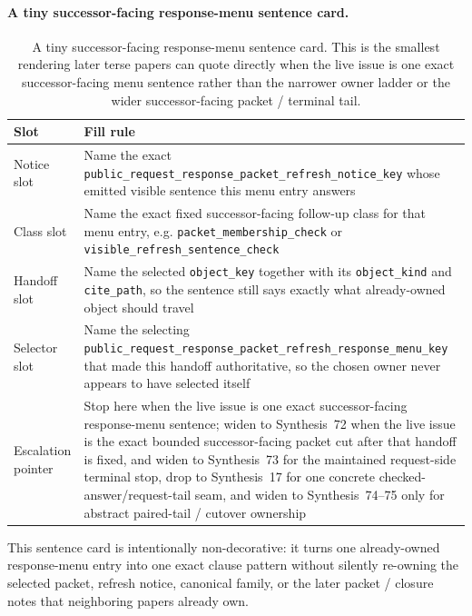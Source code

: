 \documentclass[11pt]{article}
\begin{document}
\paragraph{A tiny successor-facing response-menu sentence card.}
\begin{table}[t]
\centering
\small
\begin{tabularx}{\linewidth}{@{}lX@{}}
\toprule
Slot & Fill rule \\
\midrule
Notice slot & Name the exact \nolinkurl{public_request_response_packet_refresh_notice_key} whose emitted visible sentence this menu entry answers \\
Class slot & Name the exact fixed successor-facing follow-up class for that menu entry, e.g. \nolinkurl{packet_membership_check} or \nolinkurl{visible_refresh_sentence_check} \\
Handoff slot & Name the selected \nolinkurl{object_key} together with its \nolinkurl{object_kind} and \nolinkurl{cite_path}, so the sentence still says exactly what already-owned object should travel \\
Selector slot & Name the selecting \nolinkurl{public_request_response_packet_refresh_response_menu_key} that made this handoff authoritative, so the chosen owner never appears to have selected itself \\
Escalation pointer & Stop here when the live issue is one exact successor-facing response-menu sentence; widen to Synthesis~72 when the live issue is the exact bounded successor-facing packet cut after that handoff is fixed, and widen to Synthesis~73 for the maintained request-side terminal stop, drop to Synthesis~17 for one concrete checked-answer/request-tail seam, and widen to Synthesis~74--75 only for abstract paired-tail / cutover ownership \\
\bottomrule
\end{tabularx}
\caption{A tiny successor-facing response-menu sentence card. This is the smallest rendering later terse papers can quote directly when the live issue is one exact successor-facing menu sentence rather than the narrower owner ladder or the wider successor-facing packet / terminal tail.}
\label{tab:successor-facing-response-menu-sentence-card}
\end{table}

This sentence card is intentionally non-decorative: it turns one already-owned response-menu entry into one exact clause pattern without silently re-owning the selected packet, refresh notice, canonical family, or the later packet / closure notes that neighboring papers already own.\cite{series:workedexample}
\end{document}
